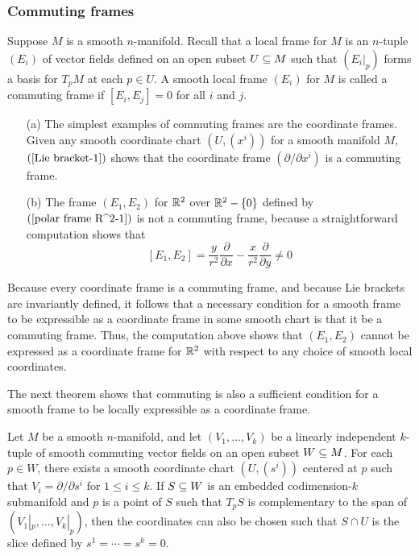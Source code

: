 \subsubsection{Commuting frames}
Suppose $M$ is a smooth $n$-manifold. Recall that a local frame for $M$ is an $n$-tuple $(E_i)$ of vector fields defined on an open subset $U\subseteq M$ such that $(E_i|_p)$ forms a basis for $T_pM$ at each $p\in U$. A smooth local frame $(E_i)$ for $M$ is called a commuting frame if $[E_i,E_j]=0$ for all $i$ and $j$. 
\begin{example}\label{commute frame eg}
\mbox{}
\begin{itemize}
\item[(a)] The simplest examples of commuting frames are the coordinate frames. Given any smooth coordinate chart $(U,(x^i))$ for a smooth manifold $M$, $(\ref{Lie bracket-1})$ shows that the coordinate frame $(\partial/\partial x^i)$ is a commuting frame.
\item[(b)] The frame $(E_1,E_2)$ for $\mathbb{R}^2$ over $\mathbb{R}^2-\{0\}$ defined by $(\ref{polar frame R^2-1})$ is not a commuting frame, because a straightforward computation shows that
\[[E_1,E_2]=\frac{y}{r^2}\frac{\partial}{\partial x}-\frac{x}{r^2}\frac{\partial}{\partial y}\neq 0\]
\end{itemize}
\end{example}
Because every coordinate frame is a commuting frame, and because Lie brackets
are invariantly defined, it follows that a necessary condition for a smooth frame to be expressible as a coordinate frame in some smooth chart is that it be a commuting frame. Thus, the computation above shows that $(E_1,E_2)$ cannot be expressed as a coordinate frame for $\mathbb{R}^2$ with respect to any choice of smooth local coordinates.\par
The next theorem shows that commuting is also a sufficient condition for a smooth frame to be locally expressible as a coordinate frame.
\begin{theorem}\label{flow commute canonical form}
Let $M$ be a smooth $n$-manifold, and let $(V_1,\dots,V_k)$ be a linearly independent $k$-tuple of smooth commuting vector fields on an open subset $W\subseteq M$. For each $p\in W$, there exists a smooth coordinate chart $(U,(s^i))$ centered at $p$ such that $V_i=\partial/\partial s^i$ for $1\leq i\leq k$. If $S\subseteq W$ is an embedded codimension-$k$ submanifold and $p$ is a point of $S$ such that $T_pS$ is complementary to the span of $(V_1|_p,\dots,V_k|_p)$, then the coordinates can also be chosen such that $S\cap U$ is the slice defined by $s^1=\cdots=s^k=0$.
\end{theorem}
